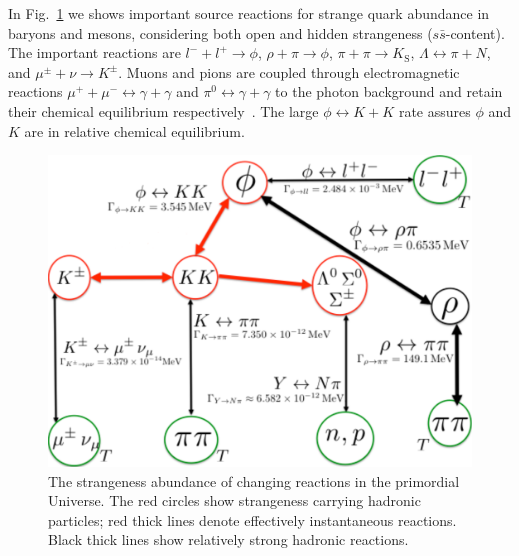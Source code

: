 \documentclass[universe,article,submit,moreauthors,pdftex,a4paper]{Definitions/mdpi}
\begin{document}
In Fig.~\ref{Strangeness_map2} we shows important source reactions for  strange quark abundance in baryons and mesons, considering both open and hidden strangeness ($s\bar s$-content). The important reactions are $l^-+l^+\rightarrow\phi$, $\rho+\pi\rightarrow\phi$, $\pi+\pi\rightarrow K_\mathrm{S}$, $\Lambda \leftrightarrow \pi+ N$, and $\mu^\pm+\nu\rightarrow K^\pm$. Muons and pions are coupled through electromagnetic reactions $\mu^++\mu^-\leftrightarrow\gamma+\gamma$ and $\pi^0\leftrightarrow\gamma+\gamma$ to the photon background and retain their chemical equilibrium respectively~\cite{Rafelski:2021aey,Kuznetsova:2008jt}. The large $\phi\leftrightarrow K+K$ rate assures $\phi$ and $K$ are in relative chemical equilibrium. 
\begin{figure} %
\centering
\includegraphics[width=0.60\linewidth]{Strangeness002_new.pdf}
\caption{
The strangeness abundance of changing reactions in the primordial Universe. The red circles show strangeness carrying hadronic particles; red thick lines denote effectively instantaneous reactions. Black thick lines show relatively strong hadronic reactions.}
\label{Strangeness_map2}
\end{figure}
\end{document}
